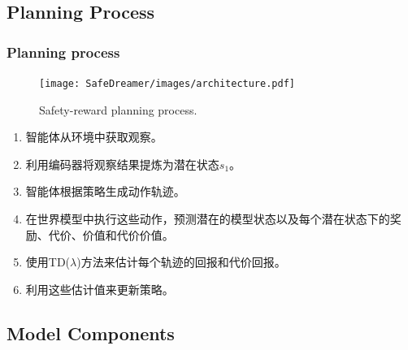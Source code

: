 \documentclass[10pt,mathserif]{beamer}%
\begin{document}
\subsection{Planning Process}
\begin{frame}[t,fragile]
    \frametitle{Planning process}
    \begin{figure}[ht]
  \centering
  \texttt{[image: SafeDreamer/images/architecture.pdf]}
  \caption{Safety-reward planning process.}
  \label{fig:architecture}
\end{figure}
\vspace{-0.5cm}
\begin{spacing}{1.2}

\begin{enumerate}
\item 智能体从环境中获取观察。
\item 利用编码器将观察结果提炼为潜在状态$s_1$。
\item 智能体根据策略生成动作轨迹。
\item 在世界模型中执行这些动作，预测潜在的模型状态以及每个潜在状态下的奖励、代价、价值和代价价值。
\item 使用TD($\lambda$)方法来估计每个轨迹的回报和代价回报。
\item 利用这些估计值来更新策略。
\end{enumerate}
    
\end{spacing}

\end{frame}


\subsection{Model Components}
\end{document}
